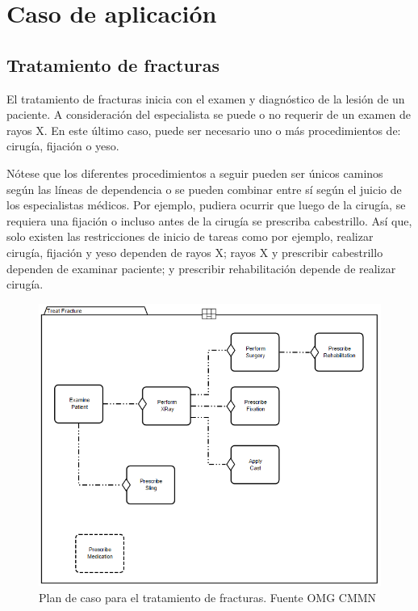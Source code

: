 \chapter{Caso de aplicación}
\label{apendicecaso}
\section{Tratamiento de fracturas}

El tratamiento de fracturas inicia con el examen y diagnóstico de la lesión de un paciente. A consideración del especialista se puede o no requerir de un examen de rayos X. En este último caso, puede ser necesario uno o más procedimientos de: cirugía, fijación o yeso. 

Nótese que los diferentes procedimientos a seguir pueden ser únicos caminos según las líneas de dependencia o se pueden combinar entre sí según el juicio de los especialistas médicos. Por ejemplo, pudiera ocurrir que luego de la cirugía, se requiera una fijación o incluso antes de la cirugía se prescriba cabestrillo. Así que, solo existen las restricciones de inicio de tareas como por ejemplo, realizar cirugía, fijación y yeso dependen de rayos X; rayos X y prescribir cabestrillo dependen de examinar paciente; y prescribir rehabilitación depende de realizar cirugía.
\begin{figure}[htp]
	\centering
		\includegraphics[width=12cm]{Fracturas1.png}
	\caption[Plan de caso para el tratamiento de fracturas]{Plan de caso para el tratamiento de fracturas. Fuente OMG CMMN}
	\label{fracturas1}
\end{figure}


